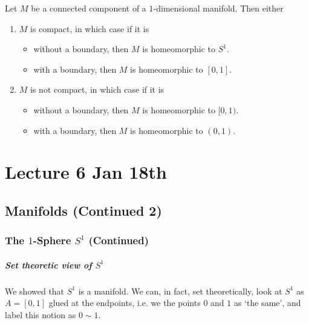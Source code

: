 \documentclass[notoc,notitlepage]{tufte-book}
\begin{document}
\begin{thm}\label{thm:_1_dimensional_manifolds_determined_by_its_compactness}
  Let $M$ be a connected component of a $1$-dimensional manifold. Then either
  \begin{enumerate}
    \item $M$ is compact, in which case if it is
      \begin{itemize}
        \item without a boundary, then $M$ is homeomorphic to $S^1$.
        \item with a boundary, then $M$ is homeomorphic to $[0, 1]$.
      \end{itemize}
    \item $M$ is not compact, in which case if it is
      \begin{itemize}
        \item without a boundary, then $M$ is homeomorphic to $[0, 1)$.
        \item with a boundary, then $M$ is homeomorphic to $(0, 1)$.
      \end{itemize}
  \end{enumerate}
\end{thm}




\chapter{Lecture 6 Jan 18th}%
\label{chp:lecture_6_jan_18th}

\section{Manifolds (Continued 2)}%
\label{sec:manifolds_continued_2}

\subsection{The $1$-Sphere $S^1$ (Continued)}%
\label{sub:the_1_sphere_s_1_continued}

\paragraph{Set theoretic view of $S^1$}
We showed that $S^1$ is a manifold. We can, in fact, set theoretically, look
at $S^1$ as $A = [0, 1]$ glued at the endpoints, i.e. we  
the points $0$ and $1$ as `the same', and label this notion as $0 \sim 1$.
\end{document}
